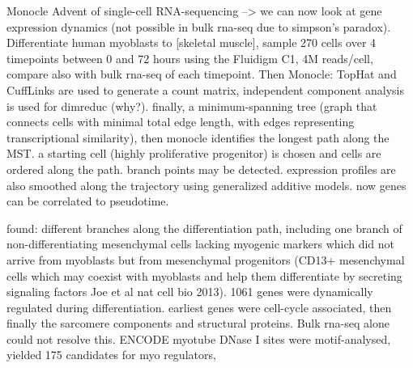 Monocle Advent of single-cell RNA-sequencing --> we can now look at gene expression dynamics (not possible in bulk rna-seq due to simpson's paradox). Differentiate human myoblasts to [skeletal muscle], sample 270 cells over 4 timepoints between 0 and 72 hours using the Fluidigm C1, 4M reads/cell, compare also with bulk rna-seq of each timepoint. Then Monocle: TopHat and CuffLinks are used to generate a count matrix, independent component analysis is used for dimreduc (why?). finally, a minimum-spanning tree (graph that connects cells with minimal total edge length, with edges representing transcriptional similarity), then monocle identifies the longest path along the MST. a starting cell (highly proliferative progenitor) is chosen and cells are ordered along the path. branch points may be detected. expression profiles are also smoothed along the trajectory using generalized additive models. now genes can be correlated to pseudotime.

found: different branches along the differentiation path, including one branch of non-differentiating mesenchymal cells lacking myogenic markers which did not arrive from myoblasts but from mesenchymal progenitors (CD13+ mesenchymal cells which may coexist with myoblasts and help them differentiate by secreting signaling factors Joe et al nat cell bio 2013). \num{1061} genes were dynamically regulated during differentiation. earliest genes were cell-cycle associated, then finally the sarcomere components and structural proteins. Bulk rna-seq alone could not resolve this. ENCODE myotube DNase I sites were motif-analysed, yielded 175 candidates for myo regulators,

